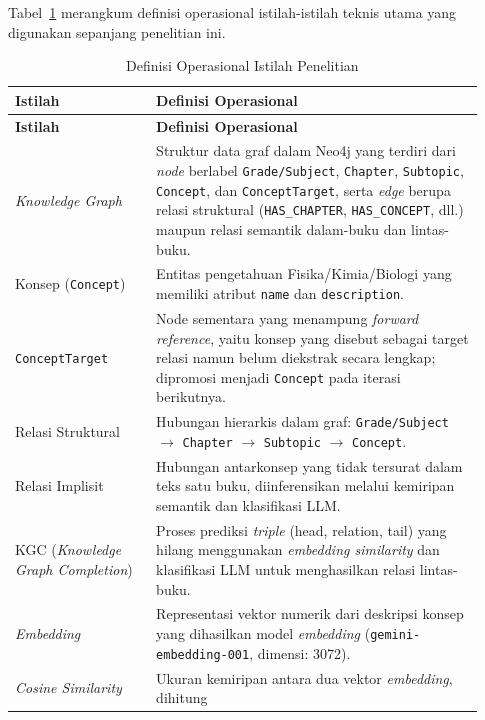 \documentclass[main]{subfiles}
\begin{document}
Tabel~\ref{tab:definisi} merangkum definisi operasional istilah-istilah
teknis utama yang digunakan sepanjang penelitian ini.

\begin{longtable}{@{}p{0.28\linewidth}p{0.65\linewidth}@{}}
  \caption{Definisi Operasional Istilah Penelitian}
  \label{tab:definisi}\\
  \toprule
  \textbf{Istilah} & \textbf{Definisi Operasional} \\
  \midrule
  \endfirsthead
  \toprule
  \textbf{Istilah} & \textbf{Definisi Operasional} \\
  \midrule
  \endhead
  \midrule
  \endfoot
  \bottomrule
  \endlastfoot
  \textit{Knowledge Graph}
    & Struktur data graf dalam Neo4j yang terdiri dari \textit{node} berlabel
      \texttt{Grade/Subject}, \texttt{Chapter}, \texttt{Subtopic},
      \texttt{Concept}, dan \texttt{ConceptTarget}, serta \textit{edge}
      berupa relasi struktural (\texttt{HAS\_CHAPTER},
      \texttt{HAS\_CONCEPT}, dll.) maupun relasi semantik
      dalam-buku dan lintas-buku. \\
  Konsep (\texttt{Concept})
    & Entitas pengetahuan Fisika/Kimia/Biologi yang memiliki atribut
      \texttt{name} dan \texttt{description}. \\
  \texttt{ConceptTarget}
    & Node sementara yang menampung \textit{forward reference}, yaitu konsep
      yang disebut sebagai target relasi namun belum diekstrak secara
      lengkap; dipromosi menjadi \texttt{Concept} pada iterasi
      berikutnya. \\
  Relasi Struktural
    & Hubungan hierarkis dalam graf: \texttt{Grade/Subject} $\to$
      \texttt{Chapter} $\to$ \texttt{Subtopic} $\to$
      \texttt{Concept}. \\
  Relasi Implisit
    & Hubungan antarkonsep yang tidak tersurat dalam teks satu buku,
      diinferensikan melalui kemiripan semantik dan klasifikasi LLM. \\
  KGC (\textit{Knowledge Graph Completion})
    & Proses prediksi \textit{triple} (head, relation, tail) yang
      hilang menggunakan \textit{embedding similarity} dan klasifikasi
      LLM untuk menghasilkan relasi lintas-buku. \\
  \textit{Embedding}
    & Representasi vektor numerik dari deskripsi konsep yang dihasilkan
      model \textit{embedding} (\texttt{gemini-embedding-001}, dimensi:
      3072). \\
  \textit{Cosine Similarity}
    & Ukuran kemiripan antara dua vektor \textit{embedding}, dihitung

\end{longtable}
\end{document}
